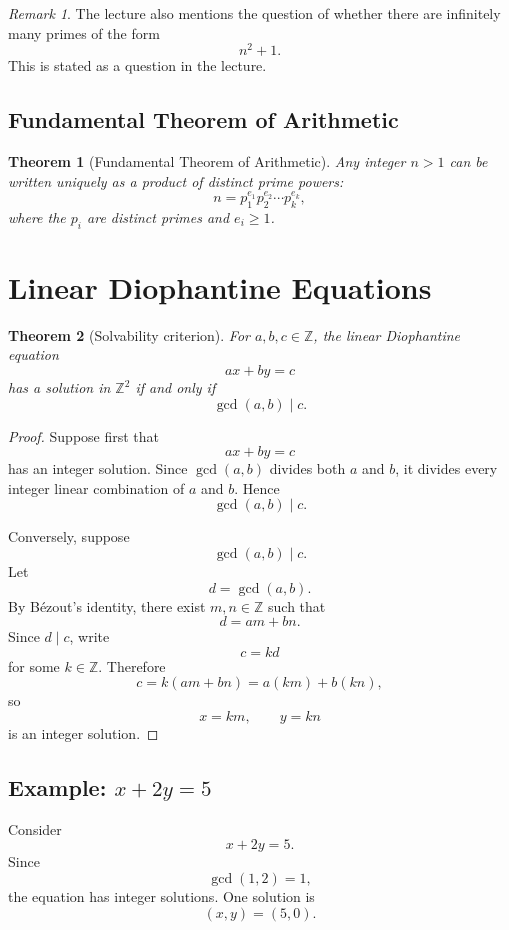 \documentclass[11pt]{article}
\newtheorem{theorem}{Theorem}[section]
\theoremstyle{remark}
\newtheorem*{remark}{Remark}
\DeclareMathOperator{\gcdop}{gcd}
\newcommand{\Z}{\mathbb Z}
\begin{document}
\begin{remark}
The lecture also mentions the question of whether there are infinitely many
primes of the form
\[
    n^2+1.
\]
This is stated as a question in the lecture.
\end{remark}

\subsection{Fundamental Theorem of Arithmetic}

\begin{theorem}[Fundamental Theorem of Arithmetic]
Any integer $n>1$ can be written uniquely as a product of distinct prime
powers:
\[
    n=p_1^{e_1}p_2^{e_2}\cdots p_k^{e_k},
\]
where the $p_i$ are distinct primes and $e_i\ge1$.
\end{theorem}

\section{Linear Diophantine Equations}

\begin{theorem}[Solvability criterion]
For $a,b,c\in\Z$, the linear Diophantine equation
\[
    ax+by=c
\]
has a solution in $\Z^2$ if and only if
\[
    \gcdop(a,b)\mid c.
\]
\end{theorem}

\begin{proof}
Suppose first that
\[
    ax+by=c
\]
has an integer solution. Since $\gcdop(a,b)$ divides both $a$ and $b$,
it divides every integer linear combination of $a$ and $b$. Hence
\[
    \gcdop(a,b)\mid c.
\]

Conversely, suppose
\[
    \gcdop(a,b)\mid c.
\]
Let
\[
    d=\gcdop(a,b).
\]
By B\'ezout's identity, there exist $m,n\in\Z$ such that
\[
    d=am+bn.
\]
Since $d\mid c$, write
\[
    c=kd
\]
for some $k\in\Z$. Therefore
\[
    c=k(am+bn)=a(km)+b(kn),
\]
so
\[
    x=km,\qquad y=kn
\]
is an integer solution.
\end{proof}

\subsection{Example: $x+2y=5$}

Consider
\[
    x+2y=5.
\]
Since
\[
    \gcdop(1,2)=1,
\]
the equation has integer solutions. One solution is
\[
    (x,y)=(5,0).
\]
\end{document}
